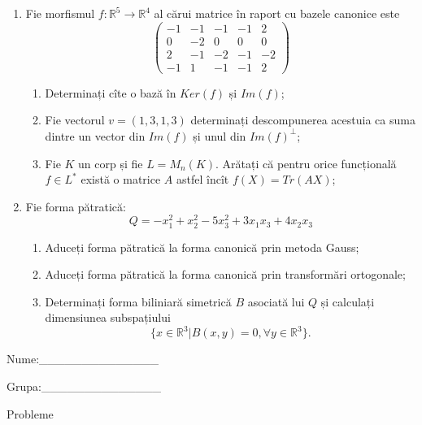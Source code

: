 \documentclass{article}
\begin{document}
\begin{enumerate}
 \item Fie morfismul $f:\mathbb{R}^5 \to \mathbb{R}^4$ al cărui matrice în raport cu bazele canonice este
$$\begin{pmatrix}
-1&-1&-1&-1&2\\
0&-2&0&0&0\\
2&-1&-2&-1&-2\\
-1&1&-1&-1&2
\end{pmatrix}$$

\begin{enumerate}
\item Determinați cîte o bază în $Ker(f)$ și $Im(f)$;
\item Fie vectorul $v=(1,3,1,3)$ determinați descompunerea acestuia ca suma dintre un vector din $Im(f)$ și unul din $Im(f)^\perp$;
\item Fie $K$ un corp și fie $L=M_n(K)$. Arătați că pentru orice funcțională $f \in L^*$ există o matrice $A$ astfel încît $f(X)=Tr(AX)$;
\end{enumerate}
\item Fie forma pătratică:
$$Q= -x_1^2+x_2^2-5x_3^2+3x_1x_3+4x_2x_3$$

\begin{enumerate}
\item Aduceți forma pătratică la forma canonică prin metoda Gauss;
\item Aduceți forma pătratică la forma canonică prin transformări ortogonale;
\item Determinați forma biliniară simetrică $B$ asociată lui $Q$ și calculați dimensiunea subspațiului
$$\{x \in \mathbb{R}^3 | B(x,y)=0,\forall y \in \mathbb{R}^3\}.$$

\end{enumerate}
\end{enumerate}
\newpage
\begin{flushright}
Nume:\_\_\_\_\_\_\_\_\_\_\_\_\_\_
 
 
Grupa:\_\_\_\_\_\_\_\_\_\_\_\_\_\_
\end{flushright}
\begin{center}
\vspace{2cm}
{\Large Probleme}
\vspace{2cm}
\end{center}
\end{document}
